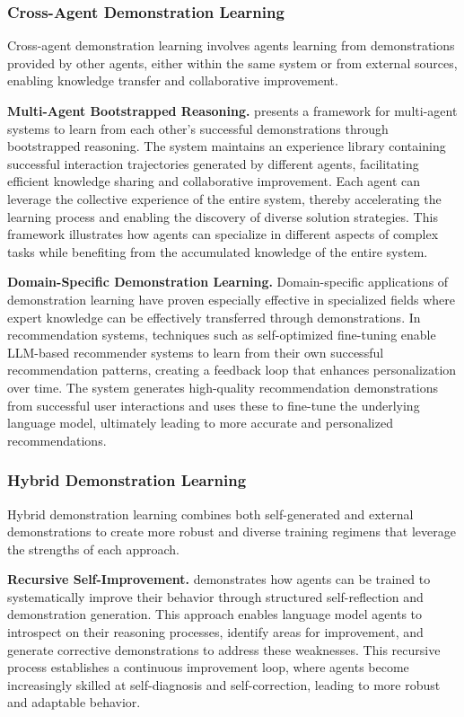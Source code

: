\documentclass[10pt]{article} %
\begin{document}
\subsubsection{Cross-Agent Demonstration Learning}

Cross-agent demonstration learning involves agents learning from demonstrations provided by other agents, either within the same system or from external sources, enabling knowledge transfer and collaborative improvement.


\textbf{Multi-Agent Bootstrapped Reasoning.} 
\cite{zhao2025sirius} presents a framework for multi-agent systems to learn from each other’s successful demonstrations through bootstrapped reasoning. The system maintains an experience library containing successful interaction trajectories generated by different agents, facilitating efficient knowledge sharing and collaborative improvement. Each agent can leverage the collective experience of the entire system, thereby accelerating the learning process and enabling the discovery of diverse solution strategies. This framework illustrates how agents can specialize in different aspects of complex tasks while benefiting from the accumulated knowledge of the entire system.

\textbf{Domain-Specific Demonstration Learning.} 
Domain-specific applications of demonstration learning have proven especially effective in specialized fields where expert knowledge can be effectively transferred through demonstrations. In recommendation systems, techniques such as self-optimized fine-tuning \citep{tang2025bridging} enable LLM-based recommender systems to learn from their own successful recommendation patterns, creating a feedback loop that enhances personalization over time. The system generates high-quality recommendation demonstrations from successful user interactions and uses these to fine-tune the underlying language model, ultimately leading to more accurate and personalized recommendations.

\subsubsection{Hybrid Demonstration Learning}

Hybrid demonstration learning combines both self-generated and external demonstrations to create more robust and diverse training regimens that leverage the strengths of each approach.

\textbf{Recursive Self-Improvement.} 
\cite{qu2024recursive} demonstrates how agents can be trained to systematically improve their behavior through structured self-reflection and demonstration generation. This approach enables language model agents to introspect on their reasoning processes, identify areas for improvement, and generate corrective demonstrations to address these weaknesses. This recursive process establishes a continuous improvement loop, where agents become increasingly skilled at self-diagnosis and self-correction, leading to more robust and adaptable behavior.
\end{document}
